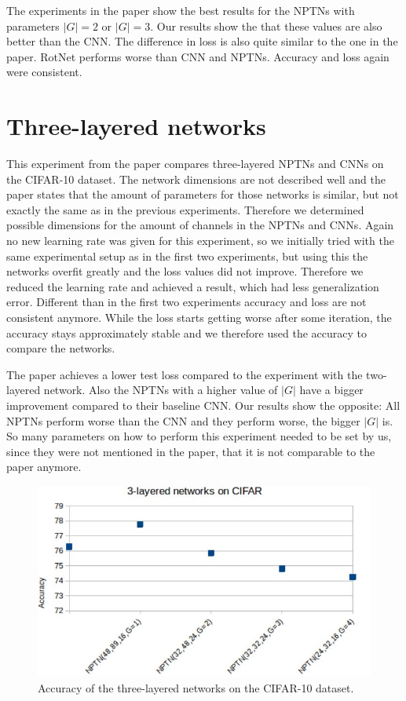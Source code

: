 \documentclass{llncs}
\begin{document}
The experiments in the paper show the best results for the NPTNs with parameters $|G|=2$ or $|G|=3$. Our results show the that these values are also better than the CNN. The difference in loss is also quite similar to the one in the paper. RotNet performs worse than CNN and NPTNs. Accuracy and loss again were consistent. 

\section{Three-layered networks}
This experiment from the paper compares three-layered NPTNs and CNNs on the CIFAR-10 \cite{CIFAR} dataset. 
The network dimensions are not described well and the paper states that the amount of parameters for those networks is similar, but not exactly the same as in the previous experiments. 
Therefore we determined possible dimensions for the amount of channels in the NPTNs and CNNs. 
Again no new learning rate was given for this experiment, so we initially tried with the same experimental setup as in the first two experiments, but using this the networks overfit greatly and the loss values did not improve. 
Therefore we reduced the learning rate and achieved a result, which had less generalization error. 
Different than in the first two experiments accuracy and loss are not consistent anymore. While the loss starts getting worse after some iteration, the accuracy stays approximately stable and we therefore used the accuracy to compare the networks.

The paper achieves a lower test loss compared to the experiment with the two-layered network. Also the NPTNs with a higher value of $|G|$ have a bigger improvement compared to their baseline CNN. Our results show the opposite: All NPTNs perform worse than the CNN and they perform worse, the bigger $|G|$ is.
So many parameters on how to perform this experiment needed to be set by us, since they were not mentioned in the paper, that it is not comparable to the paper anymore.

\begin{figure}
	\begin{center}
	\includegraphics[scale=0.35]{result_images/experiment3.jpg}
	\caption{Accuracy of the three-layered networks on  the CIFAR-10 dataset.}
	\label{pic:experiment3}
	\end{center}
\end{figure}
\end{document}
